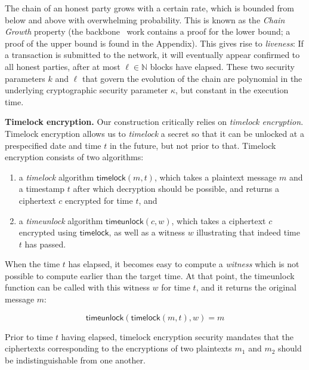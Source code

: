 The chain of an honest party grows with a certain
rate, which is bounded from below and above with overwhelming probability. This is known as
the \emph{Chain Growth} property (the backbone~\cite{backbone} work contains a proof for the
lower bound; a proof of the upper bound is found in the Appendix).
This gives rise to \emph{liveness}: If a
transaction is submitted to the network, it will eventually appear confirmed to all honest parties,
after at most $\ell \in \mathbb{N}$ blocks have elapsed. These two security parameters $k$ and $\ell$
that govern the evolution of the chain are polynomial in the underlying cryptographic security parameter
$\kappa$, but constant in the execution time.

\noindent
\textbf{Timelock encryption.}
Our construction critically relies on \emph{timelock encryption}.
Timelock encryption allows us to \emph{timelock} a secret so that it can be
unlocked at a prespecified date and time $t$ in the future, but not prior to
that. Timelock encryption consists of two algorithms:

\begin{enumerate}
  \item a \emph{timelock}
        algorithm $\textsf{timelock}(m, t)$, which takes a plaintext message $m$ and a
        timestamp $t$ after which decryption should be possible, and returns a ciphertext $c$
        encrypted for time $t$, and
  \item a \emph{timeunlock} algorithm $\textsf{timeunlock}(c, w)$, which takes a
        ciphertext $c$ encrypted using $\textsf{timelock}$, as well as a witness $w$
        illustrating that indeed time $t$ has passed.
\end{enumerate}

When the time $t$ has elapsed, it becomes easy to compute a \emph{witness} which is
not possible to compute earlier than the target time. At that point, the
\textsf{timeunlock} function can be called with this witness $w$ for time $t$, and it
returns the original message $m$:

\[
  \textsf{timeunlock}(\textsf{timelock}(m, t), w) = m
\]

Prior to time $t$ having elapsed, timelock encryption security mandates that the
ciphertexts corresponding to the encryptions of two plaintexts $m_1$
and $m_2$ should be indistinguishable from one another.

